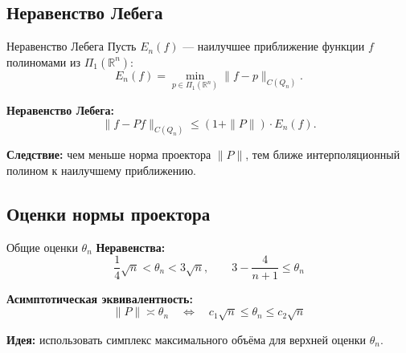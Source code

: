 \documentclass{beamer}
\begin{document}
\subsection{Неравенство Лебега}  %
\begin{frame}{Неравенство Лебега}
    Пусть $E_n(f)$ — наилучшее приближение функции $f$ полиномами из $\Pi_1(\mathbb{R}^n)$:
    \[
    E_n(f) = \min_{p \in \Pi_1(\mathbb{R}^n)} \|f - p\|_{C(Q_n)}.
    \]

    \vspace{0.3cm}

    \textbf{Неравенство Лебега:}
    \[
    \|f - P f\|_{C(Q_n)} \le (1 + \|P\|) \cdot E_n(f).
    \]

    \vspace{0.3cm}

    \textbf{Следствие:} чем меньше норма проектора $\|P\|$, тем ближе интерполяционный полином к наилучшему приближению.
\end{frame}

\subsection{Оценки нормы проектора}
\begin{frame}{Общие оценки $\theta_n$}
    \textbf{Неравенства:}
    \[
    \frac{1}{4}\sqrt{n} < \theta_n < 3\sqrt{n}, \qquad 3 - \frac{4}{n+1} \le \theta_n
    \]

    \vspace{0.3cm}

    \textbf{Асимптотическая эквивалентность:}
    \[
    \|P\| \asymp \theta_n \quad\Leftrightarrow\quad c_1\sqrt{n} \le \theta_n \le c_2\sqrt{n}
    \]

    \vspace{0.3cm}

    \textbf{Идея:} использовать симплекс максимального объёма для верхней оценки $\theta_n$.
\end{frame}

\end{document}
